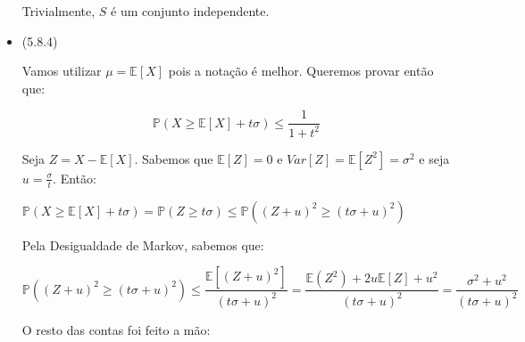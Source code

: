 \documentclass{article}
\begin{document}
\begin{itemize}
	      Trivialmente, \(S\) é um conjunto independente.






	\item (5.8.4)

	      Vamos utilizar \(\mu = \mathbb{E}[X]\) pois a notação é melhor. Queremos provar então que:

	      \[\mathbb{P}(X \geq \mathbb{E}[X] + t \sigma) \leq \frac{1}{1 + t^2}\]

	      Seja \(Z = X - \mathbb{E}[X]\). Sabemos que \(\mathbb{E}[Z] = 0\) e \(Var[Z] = \mathbb{E}[Z^2] = \sigma^2\)
	      e seja \(u = \frac{\sigma}{t}\). Então:

	      \(\mathbb{P}(X \geq \mathbb{E}[X] + t \sigma) = \mathbb{P}(Z \geq t \sigma) \leq \mathbb{P}((Z + u)^2 \geq (t \sigma + u)^2)\)

	      Pela Desigualdade de Markov, sabemos que:

	      \[\mathbb{P}((Z + u)^2 \geq (t \sigma + u)^2) \leq \frac{\mathbb{E}[(Z + u)^2]}{(t \sigma+ u)^2} = \frac{\mathbb{E}(Z^2) + 2u\mathbb{E}[Z] + u^2}{(t\sigma + u)^2} = \frac{\sigma^2 + u^2}{(t \sigma + u)^2}\]

	      O resto das contas foi feito a mão:


\end{itemize}
\end{document}
